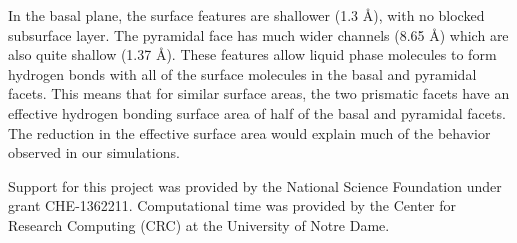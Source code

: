\documentclass[aps,jcp,preprint,showpacs,superscriptaddress,groupedaddress]{revtex4}  %
\begin{document}
In the basal plane, the surface features are shallower (1.3 \AA), with
no blocked subsurface layer.  The pyramidal face has much wider
channels (8.65 \AA) which are also quite shallow (1.37 \AA).  These
features allow liquid phase molecules to form hydrogen bonds with all
of the surface molecules in the basal and pyramidal facets.  This
means that for similar surface areas, the two prismatic facets have an
effective hydrogen bonding surface area of half of the basal and
pyramidal facets.  The reduction in the effective surface area would
explain much of the behavior observed in our simulations.

\begin{acknowledgments}
  Support for this project was provided by the National
  Science Foundation under grant CHE-1362211. Computational time was
  provided by the Center for Research Computing (CRC) at the
  University of Notre Dame.
\end{acknowledgments}

\newpage


\end{document}
